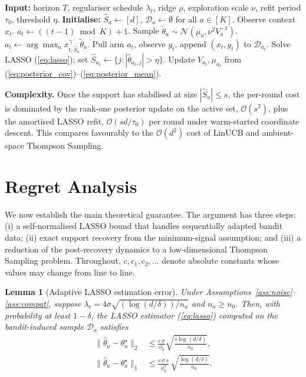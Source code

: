 \documentclass[10pt,journal,twoside,twocolumn]{IEEEtran}
\newtheorem{lemma}{Lemma}
\begin{document}
\begin{algorithm}[t]
\caption{FGTS-LASSO}\label{alg:fgts}
\begin{algorithmic}[1]
\STATE \textbf{Input:} horizon $T$, regulariser schedule $\lambda_t$, ridge $\rho$, exploration scale $\nu$, refit period $\tau_0$, threshold $\eta$.
\STATE \textbf{Initialise:} $\hat{S}_a \leftarrow [d]$, $\mathcal{D}_a \leftarrow \emptyset$ for all $a \in [K]$.
    \STATE Observe context $x_t$.
        \STATE $a_t \leftarrow ((t-1) \bmod K) + 1$.
    \ELSE
            \STATE Sample $\tilde{\theta}_a \sim \mathcal{N}(\mu_a, \nu^2 V_a^{-1})$.
        \ENDFOR
        \STATE $a_t \leftarrow \arg\max_a x_{t,\hat{S}_a}^\top \tilde{\theta}_a$.
    \ENDIF
    \STATE Pull arm $a_t$, observe $y_t$, append $(x_t, y_t)$ to $\mathcal{D}_{a_t}$.
        \STATE Solve LASSO (\ref{eq:lasso}); set $\hat{S}_{a_t} \leftarrow \{j: |\hat\theta_{a_t, j}| > \eta\}$.
    \ENDIF
    \STATE Update $V_{a_t}, \mu_{a_t}$ from (\ref{eq:posterior_cov})--(\ref{eq:posterior_mean}).
\ENDFOR
\end{algorithmic}
\end{algorithm}

\textbf{Complexity.} Once the support has stabilised at size $|\hat{S}_a| \leq s$, the per-round cost is dominated by the rank-one posterior update on the active set, $\mathcal{O}(s^2)$, plus the amortised LASSO refit, $\mathcal{O}(s d / \tau_0)$ per round under warm-started coordinate descent. This compares favourably to the $\mathcal{O}(d^2)$ cost of LinUCB and ambient-space Thompson Sampling.

\section{Regret Analysis}\label{sec:theory}

We now establish the main theoretical guarantee. The argument has three steps: (i) a self-normalised LASSO bound that handles sequentially adapted bandit data; (ii) exact support recovery from the minimum-signal assumption; and (iii) a reduction of the post-recovery dynamics to a low-dimensional Thompson Sampling problem. Throughout, $c, c_1, c_2, \dots$ denote absolute constants whose values may change from line to line.

\begin{lemma}[Adaptive LASSO estimation error]\label{lem:lasso}
Under Assumptions~\ref{ass:noise}--\ref{ass:compat}, suppose $\lambda_t = 4\sigma\sqrt{(\log(d/\delta))/n_a}$ and $n_a \geq n_0$. Then, with probability at least $1-\delta$, the LASSO estimator (\ref{eq:lasso}) computed on the bandit-induced sample $\mathcal{D}_a$ satisfies
\begin{align}
\|\hat{\theta}_a - \theta^{\star}_a\|_2 &\leq \frac{c\, \sigma}{\phi_0} \sqrt{\frac{s \log(d/\delta)}{n_a}}, \label{eq:l2_err}\\
\|\hat{\theta}_a - \theta^{\star}_a\|_1 &\leq \frac{c\, \sigma\, s}{\phi_0^2}\, \sqrt{\frac{\log(d/\delta)}{n_a}}. \label{eq:l1_err}
\end{align}
\end{lemma}
\end{document}
